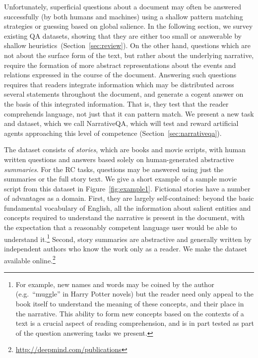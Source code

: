 \documentclass[11pt,letterpaper]{article}
\begin{document}
Unfortunately, superficial questions about a document may often be answered successfully (by both humans and machines) using a shallow pattern matching strategies or guessing based on global salience. 
In the following section, we survey existing QA datasets, showing that they are either too small or answerable by shallow heuristics~(Section~\ref{sec:review}). On the other hand, questions which are not about the surface form of the text, but rather about the underlying narrative, require the formation of more abstract representations about the events and relations expressed in the course of the document. Answering such questions requires that readers integrate information which may be distributed across several statements throughout the document, and generate a cogent answer on the basis of this integrated information. That is, they test that the reader comprehends language, not just that it can pattern match. We present a new task and dataset, which we call NarrativeQA, which will test and reward artificial agents approaching this level of competence (Section~\ref{sec:narrativeqa}).



The dataset consists of \emph{stories}, which are books and movie scripts, with human written questions and answers based solely on human-generated abstractive \emph{summaries}. For the RC tasks, questions may be answered using just the summaries or the full story text. We give a short example of a sample movie script from this dataset in Figure~\ref{fig:example1}.
Fictional stories have a number of advantages as a domain. First, they are largely self-contained: beyond the basic fundamental vocabulary of English, all the information about salient entities and concepts required to understand the narrative is present in the document, with the expectation that a reasonably competent language user would be able to understand it.\footnote{For example, new names and words may be coined by the author (e.g.~``muggle'' in Harry Potter novels) but the reader need only appeal to the book itself to understand the meaning of these concepts, and their place in the narrative. This ability to form new concepts based on the contexts of a text is a crucial aspect of reading comprehension, and is in part tested as part of the question answering tasks we present.} Second, story summaries are abstractive and generally written by independent authors who know the work only as a reader.
We make the dataset available online.\footnote{\url{http://deepmind.com/publications}}
\end{document}
